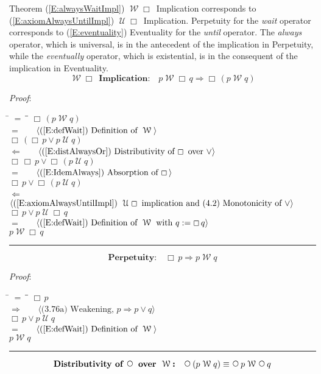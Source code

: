 \documentclass[12pt, fleqn, leqno]{article}
\newcommand{\lgap}{2pt}                             %
\newcommand{\mymathindent}{24pt}                    %
\newcommand{\impl}{\ensuremath{\Rightarrow}}        %
\newcommand{\foll}{\ensuremath{\Leftarrow}}         %
\newcommand{\Until}{\;\mathcal{U}\;}
\newcommand{\Wait}{\;\mathcal{W}\;}
\newcommand{\Next}{\;\,\text{\raisebox{3.5pt}{\circle{6}}}}
\newcommand{\Always}{\Box\,}
\newcommand{\myqed}{\rule[-.23ex]{1.2ex}{2.0ex}}
\newcommand{\myqedtab}{\hspace{384pt}}              %
\newcommand{\Gll} {\langle}                         %
\newcommand{\Ggg} {\rangle}                         %
\newcommand{\Hint}[1]     {\ \ \ $\Gll              \mbox{#1} \Ggg$ }   %
\begin{document}
Theorem (\ref{E:alwaysWaitImpl}) $\Wait\Always$ Implication corresponds to (\ref{E:axiomAlwaysUntilImpl}) $\Until\Always$ Implication.
Perpetuity for the \textit{wait} operator corresponds to (\ref{E:eventuality}) Eventuality
for the \textit{until} operator.
The \textit{always} operator, which is universal, is in the antecedent of the implication in Perpetuity, while
the \textit{eventually} operator, which is existential, is in the consequent of the implication in Eventuality.
\begin{equation}\label{E:alwaysWaitImpl}
\textbf{$\Wait\Always$ Implication:}\quad p\Wait\Always q \impl\Always (p \Wait q)
\end{equation}

\emph{Proof}:
\begin{tabbing}
\hspace{\mymathindent} \= $= \;$ \= \myqedtab \= \kill
\> \> $\Always (p \Wait q)$\\[\lgap]
\> $=$ \> \Hint{(\ref{E:defWait}) Definition of $\Wait$} \\[\lgap]
\> \> $\Always (\Always p\lor p \Until q)$\\[\lgap]
\> $\foll$ \> \Hint{(\ref{E:distAlwaysOr}) Distributivity of $\Always$ over $\lor$} \\[\lgap]
\> \> $\Always\Always p\lor \Always(p \Until q)$\\[\lgap]
\> $=$ \>  \Hint{(\ref{E:IdemAlways}) Absorption of $\Always$}\\[\lgap]
\> \> $\Always p\lor \Always(p \Until q)$\\[\lgap]
\> $\foll$ \> \Hint{(\ref{E:axiomAlwaysUntilImpl}) $\Until\Always$ implication and (4.2) Monotonicity of $\lor$}\\[\lgap]
\> \> $\Always p\lor p \Until \Always q$\\[\lgap]
\> $=$ \> \Hint{(\ref{E:defWait}) Definition of $\Wait$ with $q := \Always q$} \\[\lgap]
\> \> $p \Wait \Always q$ \quad \myqed
\end{tabbing}
\begin{equation}\label{E:alwaysImpWait}
\textbf{Perpetuity:}\quad \Always p \impl p \Wait q
\end{equation}

\emph{Proof}:
\begin{tabbing}
\hspace{\mymathindent} \= $= \;$ \= \myqedtab \= \kill
\> \> $\Always p$\\[\lgap]
\> $\impl$ \> \Hint{(3.76a) Weakening, $p\impl p\lor q$} \\[\lgap]
\> \> $\Always p \lor p \Until q$\\[\lgap]
\> $=$ \> \Hint{(\ref{E:defWait}) Definition of $\Wait$} \\[\lgap]
\> \> $p \Wait q$ \quad \myqed
\end{tabbing}
\begin{equation}\label{E:waitNextDist}
\textbf{Distributivity of $\Next$ over $\Wait$:}\quad \Next (p \Wait q) \equiv \Next p \Wait \Next q
\end{equation}
\end{document}
